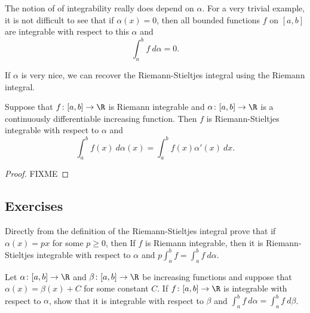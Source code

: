 \begin{example}
The notion of of integrability really does depend on $\alpha$.  For a
very trivial example,
it is not difficult to see that if $\alpha(x) = 0$, then
all bounded functions $f$ on $[a,b]$ are integrable with
respect to this $\alpha$ and
\begin{equation*}
\int_a^b f~d \alpha = 0.
\end{equation*}
\end{example}

If $\alpha$ is very nice, we can recover the Riemann-Stieltjes integral
using the Riemann integral.

\begin{prop}
Suppose that $f \colon [a,b] \to \R$ is Riemann integrable
and $\alpha \colon [a,b] \to \R$ is a continuously differentiable
increasing function.
Then $f$ is Riemann-Stieltjes integrable with respect to $\alpha$
and
\begin{equation*}
\int_a^b f(x)~d\alpha(x) = \int_a^b f(x) \alpha'(x)~dx .
\end{equation*}
\end{prop}

\begin{proof}
FIXME
\end{proof}

\subsection{Exercises}

\begin{exercise}
Directly from the definition of the Riemann-Stieltjes integral prove that if
$\alpha(x) = px$ for some $p \geq 0$, then 
If $f$ is Riemann integrable, then it is Riemann-Stieltjes integrable
with respect to $\alpha$ and
$p \int_a^b f = \int_a^b f~d\alpha$.
\end{exercise}

\begin{exercise}
Let $\alpha \colon [a,b] \to \R$
and $\beta \colon [a,b] \to \R$ be increasing functions and
suppose that $\alpha(x) = \beta(x) + C$ for some constant $C$.
If $f \colon [a,b] \to \R$
is integrable with respect to $\alpha$, show that it is
integrable with respect to $\beta$ and $\int_a^b f~d\alpha = \int_a^b f~d\beta$.
\end{exercise}



